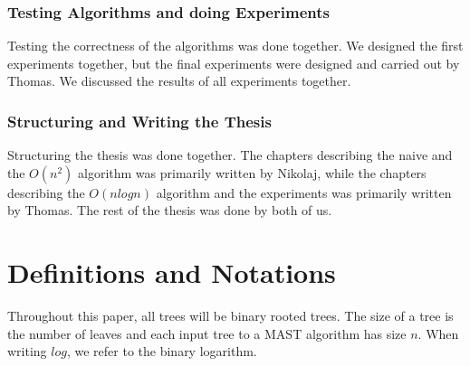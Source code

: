 \subsubsection{Testing Algorithms and doing Experiments}
Testing the correctness of the algorithms was done together. We designed the first experiments together, but the final experiments were designed and carried out by Thomas. We discussed the results of all experiments together.

\subsubsection{Structuring and Writing the Thesis}
Structuring the thesis was done together. The chapters describing the naive and the $O(n^2)$ algorithm was primarily written by Nikolaj, while the chapters describing the $O(nlogn)$ algorithm and the experiments was primarily written by Thomas. The rest of the thesis was done by both of us.

\section{Definitions and Notations}
Throughout this paper, all trees will be binary rooted trees. The size of a tree is the number of leaves and each input tree to a MAST algorithm has size $n$. When writing $log$, we refer to the binary logarithm.



